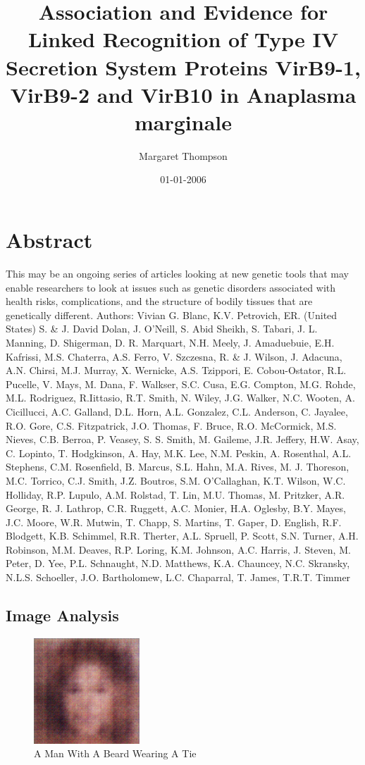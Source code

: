 \documentclass{article}%
\title{Association and Evidence for Linked Recognition of Type IV Secretion System Proteins VirB9{-}1, VirB9{-}2 and VirB10 in Anaplasma marginale}%
\author{Margaret Thompson}%
\affil{Department of Veterinary Medicine, School of Veterinary Medicine, National Taiwan University, Taipei, Taiwan, R.O.C., Department of Surgery, Mackay Memorial Hospital, Taipei, Taiwan, R.O.C., Research Institute for Children, Children's Hospital, New Orleans, LA, USA}%
\date{01{-}01{-}2006}%
\begin{document}
%
\normalsize%
\maketitle%
\section{Abstract}%
\label{sec:Abstract}%
This may be an ongoing series of articles looking at new genetic tools that may enable researchers to look at issues such as genetic disorders associated with health risks, complications, and the structure of bodily tissues that are genetically different.\newline%
Authors: Vivian G. Blanc, K.V. Petrovich, ER. (United States) S. \& J. David Dolan, J. O'Neill, S. Abid Sheikh, S. Tabari, J. L. Manning, D. Shigerman, D. R. Marquart, N.H. Meely, J. Amaduebuie, E.H. Kafrissi, M.S. Chaterra, A.S. Ferro, V. Szczesna, R. \& J. Wilson, J. Adacuna, A.N. Chirsi, M.J. Murray, X. Wernicke, A.S. Tzippori, E. Cobou{-}Ostator, R.L. Pucelle, V. Mays, M. Dana, F. Walkser, S.C. Cusa, E.G. Compton, M.G. Rohde, M.L. Rodriguez, R.Iittasio, R.T. Smith, N. Wiley, J.G. Walker, N.C. Wooten, A. Cicillucci, A.C. Galland, D.L. Horn, A.L. Gonzalez, C.L. Anderson, C. Jayalee, R.O. Gore, C.S. Fitzpatrick, J.O. Thomas, F. Bruce, R.O. McCormick, M.S. Nieves, C.B. Berroa, P. Veasey, S. S. Smith, M. Gaileme, J.R. Jeffery, H.W. Asay, C. Lopinto, T. Hodgkinson, A. Hay, M.K. Lee, N.M. Peskin, A. Rosenthal, A.L. Stephens, C.M. Rosenfield, B. Marcus, S.L. Hahn, M.A. Rives, M. J. Thoreson, M.C. Torrico, C.J. Smith, J.Z. Boutros, S.M. O'Callaghan, K.T. Wilson, W.C. Holliday, R.P. Lupulo, A.M. Rolstad, T. Lin, M.U. Thomas, M. Pritzker, A.R. George, R. J. Lathrop, C.R. Ruggett, A.C. Monier, H.A. Oglesby, B.Y. Mayes, J.C. Moore, W.R. Mutwin, T. Chapp, S. Martins, T. Gaper, D. English, R.F. Blodgett, K.B. Schimmel, R.R. Therter, A.L. Spruell, P. Scott, S.N. Turner, A.H. Robinson, M.M. Deaves, R.P. Loring, K.M. Johnson, A.C. Harris, J. Steven, M. Peter, D. Yee, P.L. Schnaught, N.D. Matthews, K.A. Chauncey, N.C. Skransky, N.L.S. Schoeller, J.O. Bartholomew, L.C. Chaparral, T. James, T.R.T. Timmer

%
\subsection{Image Analysis}%
\label{subsec:ImageAnalysis}%


\begin{figure}[h!]%
\centering%
\includegraphics[width=150px]{500_fake_images/samples_5_371.png}%
\caption{A Man With A Beard Wearing A Tie}%
\end{figure}

%
\end{document}
